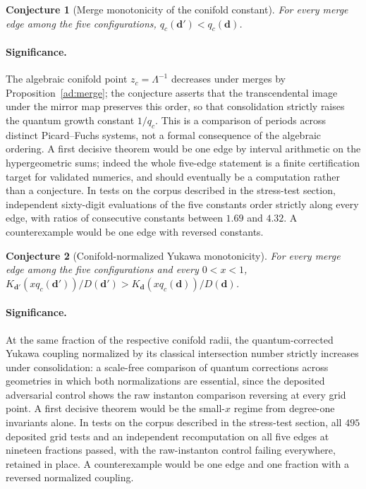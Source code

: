 \documentclass[11pt]{article}
\newtheorem{conjecture}{Conjecture}
\theoremstyle{definition}
\begin{document}
\begin{conjecture}[Merge monotonicity of the conifold constant]\label{ad8}
For every merge edge among the five configurations, $q_c(\mathbf d')<q_c(\mathbf d)$.
\end{conjecture}

\paragraph{Significance.}
The algebraic conifold point $z_c=\Lambda^{-1}$ decreases under merges by Proposition~\ref{ad:merge}; the conjecture asserts that the transcendental image under the mirror map preserves this order, so that consolidation strictly raises the quantum growth constant $1/q_c$.  This is a comparison of periods across distinct Picard--Fuchs systems, not a formal consequence of the algebraic ordering.  A first decisive theorem would be one edge by interval arithmetic on the hypergeometric sums; indeed the whole five-edge statement is a finite certification target for validated numerics, and should eventually be a computation rather than a conjecture.  In tests on the corpus described in the stress-test section, independent sixty-digit evaluations of the five constants order strictly along every edge, with ratios of consecutive constants between $1.69$ and $4.32$.  A counterexample would be one edge with reversed constants.

\begin{conjecture}[Conifold-normalized Yukawa monotonicity]\label{ad9}
For every merge edge among the five configurations and every $0<x<1$, $K_{\mathbf d'}(xq_c(\mathbf d'))/D(\mathbf d')>K_{\mathbf d}(xq_c(\mathbf d))/D(\mathbf d)$.
\end{conjecture}

\paragraph{Significance.}
At the same fraction of the respective conifold radii, the quantum-corrected Yukawa coupling normalized by its classical intersection number strictly increases under consolidation: a scale-free comparison of quantum corrections across geometries in which both normalizations are essential, since the deposited adversarial control shows the raw instanton comparison reversing at every grid point.  A first decisive theorem would be the small-$x$ regime from degree-one invariants alone.  In tests on the corpus described in the stress-test section, all $495$ deposited grid tests and an independent recomputation on all five edges at nineteen fractions passed, with the raw-instanton control failing everywhere, retained in place.  A counterexample would be one edge and one fraction with a reversed normalized coupling.
\end{document}
